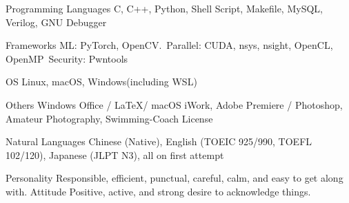 

\begin{cvskills}

  \cvskill
    {Programming Languages} %
    {C, C++, Python, Shell Script, Makefile, MySQL, Verilog, GNU Debugger} %

  \cvskill
    {Frameworks} %
    {ML: PyTorch, OpenCV.\ Parallel: CUDA, nsys, nsight, OpenCL, OpenMP\ Security: Pwntools} %

  \cvskill
    {OS} %
    {Linux, macOS, Windows(including WSL)} %

  \cvskill
    {Others} %
    {Windows Office / \LaTeX / macOS iWork, Adobe Premiere / Photoshop, Amateur Photography, Swimming-Coach License} %

  \cvskill
    {Natural Languages} %
    {Chinese (Native), English (TOEIC 925/990, TOEFL 102/120), Japanese (JLPT N3), all on first attempt} %

\end{cvskills}


\begin{cvskills}
    \cvskill
        {Personality}
        {Responsible, efficient, punctual, careful, calm, and easy to get along with.}
    \cvskill
        {Attitude}
        {Positive, active, and strong desire to acknowledge things.}
\end{cvskills}